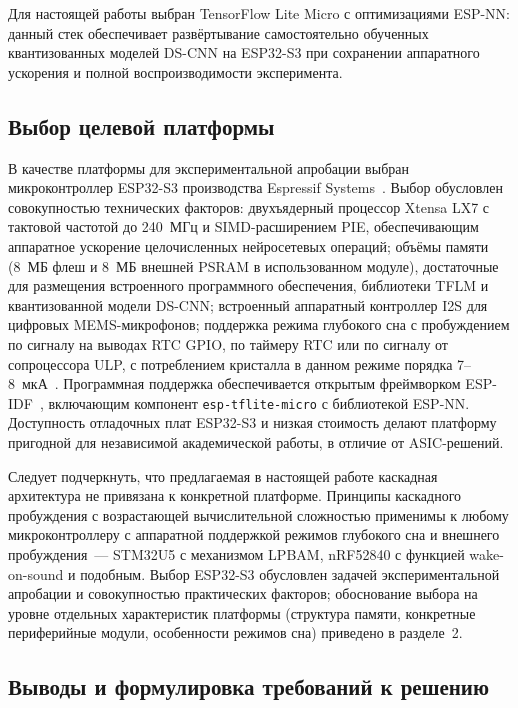 Для настоящей работы выбран TensorFlow Lite Micro с оптимизациями
ESP-NN: данный стек обеспечивает развёртывание самостоятельно обученных
квантизованных моделей DS-CNN на ESP32-S3 при сохранении аппаратного
ускорения и полной воспроизводимости эксперимента.

\subsection{Выбор целевой платформы}

В качестве платформы для экспериментальной апробации выбран
микроконтроллер ESP32-S3 производства Espressif Systems~\cite{src:9}.
Выбор обусловлен совокупностью технических факторов: двухъядерный
процессор Xtensa LX7 с тактовой частотой до 240~МГц и SIMD-расширением
PIE, обеспечивающим аппаратное ускорение целочисленных нейросетевых
операций; объёмы памяти (8~МБ флеш и 8~МБ внешней PSRAM в использованном
модуле), достаточные для размещения встроенного программного обеспечения,
библиотеки TFLM и квантизованной модели DS-CNN; встроенный аппаратный
контроллер I2S для цифровых MEMS-микрофонов; поддержка режима глубокого
сна с пробуждением по сигналу на выводах RTC GPIO, по таймеру RTC или по
сигналу от сопроцессора ULP, с потреблением кристалла в данном режиме порядка
7--8~мкА~\cite{src:9}. Программная поддержка обеспечивается открытым
фреймворком ESP-IDF~\cite{src:17}, включающим компонент
\texttt{esp-tflite-micro} с библиотекой ESP-NN. Доступность отладочных
плат ESP32-S3 и низкая стоимость делают платформу пригодной для
независимой академической работы, в отличие от ASIC-решений.

Следует подчеркнуть, что предлагаемая в настоящей работе каскадная
архитектура не привязана к конкретной платформе. Принципы
каскадного пробуждения с возрастающей вычислительной сложностью
применимы к любому микроконтроллеру с аппаратной поддержкой режимов
глубокого сна и внешнего пробуждения~--- STM32U5 с механизмом LPBAM,
nRF52840 с функцией wake-on-sound и подобным. Выбор ESP32-S3 обусловлен
задачей экспериментальной апробации и совокупностью практических
факторов; обоснование выбора на уровне отдельных характеристик
платформы (структура памяти, конкретные периферийные модули,
особенности режимов сна) приведено в разделе~2.

\subsection{Выводы и формулировка требований к решению}

